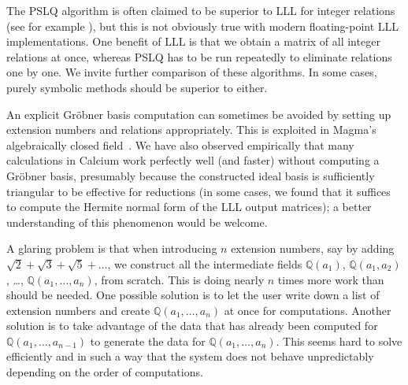 \documentclass[sigconf,screen,urlbreakonhyphens]{acmart}
\begin{document}
The PSLQ algorithm is often claimed to be superior to LLL for
integer relations (see for example \cite{BBK2014}),
but this is not obviously true
with modern floating-point LLL implementations.
One benefit of LLL is that we obtain
a matrix of all integer relations at once,
whereas PSLQ has to be run repeatedly to eliminate relations
one by one. We invite further comparison of these algorithms.
In some cases, purely symbolic methods
should be superior to either.

An explicit Gr\"{o}bner basis computation can sometimes be avoided
by setting up extension numbers and relations appropriately.
This is exploited in Magma's algebraically closed field~\cite{Ste2010}.
We have also observed empirically that many calculations in Calcium
work perfectly well (and faster) without computing a Gr\"{o}bner basis,
presumably because the constructed ideal basis is sufficiently triangular
to be effective for reductions (in some cases, we found that
it suffices to compute the Hermite normal form of the LLL output matrices);
a better understanding of this phenomenon would be welcome.

A glaring problem is that when introducing
$n$ extension numbers,
say by adding $\sqrt{2} + \sqrt{3} + \sqrt{5} + \ldots$,
we construct all the intermediate
fields $\mathbb{Q}(a_1)$, $\mathbb{Q}(a_1,a_2)$, \ldots, $\mathbb{Q}(a_1,\ldots,a_n)$,
from scratch.
This is doing nearly $n$ times more work than should be needed.
One possible solution is to let
the user write down a list of extension numbers
and create $\mathbb{Q}(a_1,\ldots,a_n)$ at once for computations.
Another solution is to take advantage of the data that has
already been computed for
$\mathbb{Q}(a_1,\ldots,a_{n-1})$
to generate the data for $\mathbb{Q}(a_1,\ldots,a_n)$.
This seems hard to solve efficiently
and in such a way that the system does not behave
unpredictably depending on the
order of computations.



\end{document}
